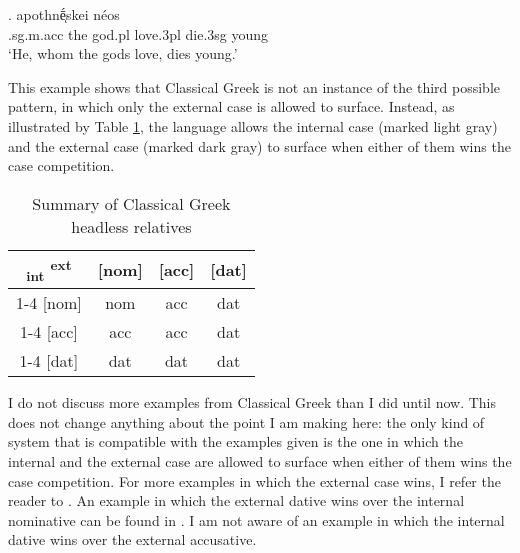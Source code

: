 \exg.     apothnḗͅskei néos\\
.\ac{sg}.\ac{m}.\ac{acc} the god.\ac{pl} love.3\ac{pl}\scsub{[acc]} die.3\ac{sg}\scsub{[nom]} young\\
`He, whom the gods love, dies young.' \label{ex:ag-nom-acc}

This example shows that Classical Greek is not an instance of the third possible pattern, in which only the external case is allowed to surface. Instead, as illustrated by Table \ref{tbl:case-competition-classical-greek}, the language allows the internal case (marked light gray) and the external case (marked dark gray) to surface when either of them wins the case competition.

\begin{table}[ht]
  \center
  \caption{Summary of Classical Greek headless relatives}
  \begin{tabular}{c|c|c|c}
    \toprule
    \textsubscript{\ac{int}} \textsuperscript{\ac{ext}}
           & [\ac{nom}]
           & [\ac{acc}]
           & [\ac{dat}]
           \\ \cmidrule{1-4}
       [\ac{nom}]
           & \ac{nom}
           & \ac{acc}
           & \ac{dat}
           \\ \cmidrule{1-4}
       [\ac{acc}]
           & \cellcolor{LG}\ac{acc}
           & \ac{acc}
           & \cellcolor{DG}\ac{dat}
           \\ \cmidrule{1-4}
       [\ac{dat}]
           & \ac{dat}
           & \ac{dat}
           & \ac{dat}
           \\
     \bottomrule
  \end{tabular}
    \label{tbl:case-competition-classical-greek}
\end{table}

I do not discuss more examples from Classical Greek than I did until now. This does not change anything about the point I am making here: the only kind of system that is compatible with the examples given is the one in which the internal and the external case are allowed to surface when either of them wins the case competition. For more examples in which the external case wins, I refer the reader to . An example in which the external dative wins over the internal nominative can be found in \citet{noussia2015}. I am not aware of an example in which the internal dative wins over the external accusative.


